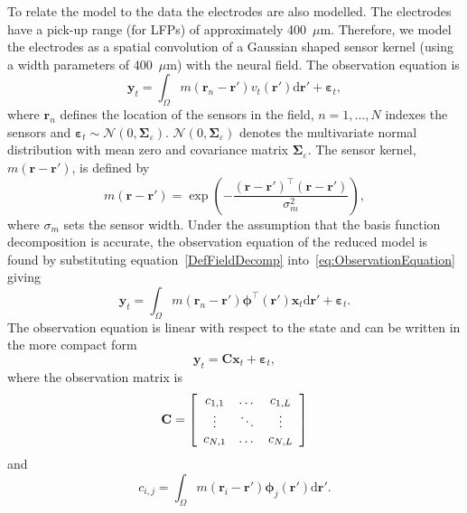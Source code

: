\documentclass[]{article}
\begin{document}
To relate the model to the data the electrodes are also modelled. The electrodes have a pick-up range (for LFPs) of approximately 400~$\mu$m. Therefore, we model the electrodes as a spatial convolution of a Gaussian shaped sensor kernel (using a width parameters of 400~$\mu$m) with the neural field. The observation equation is
\begin{equation}
    \label{eq:ObservationEquation}
	\mathbf{y}_t =
	\int_{\Omega}{
	    m\left(\mathbf{r}_n-\mathbf{r}'\right)v_t\left(\mathbf{r}'\right)
	\textrm{d}\mathbf{r}'} + 
	\boldsymbol{\varepsilon}_t, 
\end{equation}
where $\mathbf{r}_n$ defines the location of the sensors in the field, $n=1,...,N$ indexes the sensors and $\boldsymbol{\varepsilon}_t \sim \mathcal{N}\left(0,\boldsymbol{\Sigma}_{\varepsilon}\right)$. $\mathcal{N}\left(0,\boldsymbol{\Sigma}_{\varepsilon}\right)$ denotes the multivariate normal distribution with mean zero and covariance matrix $\boldsymbol{\Sigma}_{\varepsilon}$. The sensor kernel, $m(\mathbf{r}-\mathbf{r}')$, is defined by 
\begin{equation}
	m\left(\mathbf{r}-\mathbf{r}'\right) = \exp{\left(-\frac{(\mathbf{r}-\mathbf{r}')^\top(\mathbf{r}-\mathbf{r}')}{\sigma_m^2}\right)},
\end{equation}
where $\sigma_m$ sets the sensor width. Under the assumption that the basis function decomposition is accurate, the observation equation of the reduced model is found by substituting equation~\ref{DefFieldDecomp} into~\ref{eq:ObservationEquation} giving
\begin{equation}\label{eq:ReducedObservationEquation}
	\mathbf{y}_t = \int_{\Omega}{m\left(\mathbf{r}_n-\mathbf{r}'\right)\boldsymbol{\phi}^{\top}\left(\mathbf{r'}\right) \mathbf{x}_t\textrm{d}\mathbf{r}'} + \boldsymbol{\varepsilon}_t. 
\end{equation}
The observation equation is linear with respect to the state and can be written in the more compact form
\begin{equation}\label{ObservationEquation} 
	\mathbf{y}_t = \mathbf{C}\mathbf{x}_t + \boldsymbol{\varepsilon}_t,
\end{equation}
where the observation matrix is 
\begin{equation}
	\mathbf{C} = \left[
	\begin{array}{{ccc}} 
		c_{1,1} & \dots & c_{1,L} \\
		\vdots & \ddots & \vdots \\
		c_{N,1} & \dots & c_{N,L} 
	\end{array}
	\right] 
\end{equation}
and 
\begin{equation}
	c_{i,j} = \int_{\Omega}m(\mathbf{r}_i - \mathbf{r}')\boldsymbol{\phi}_j(\mathbf{r}')\textrm{d}\mathbf{r}'. 
\end{equation}
\end{document}
